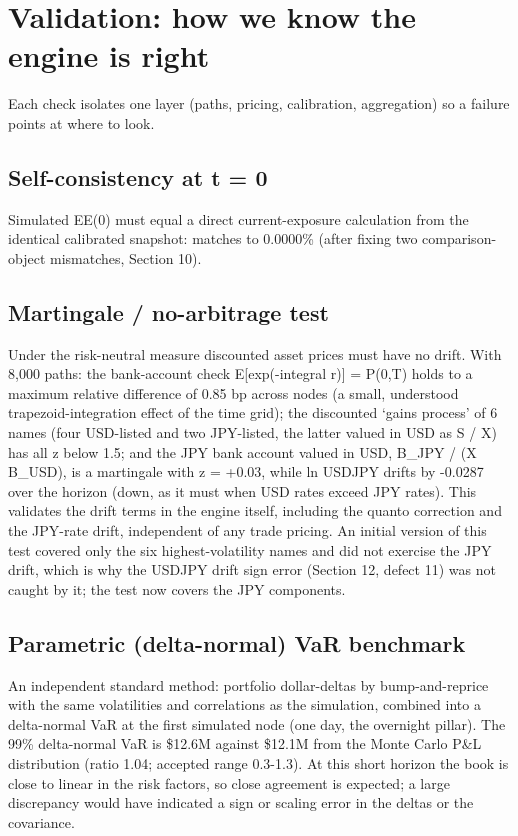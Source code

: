 \documentclass[11pt,letterpaper]{article}
\begin{document}
\clearpage
\section{Validation: how we know the engine is right}
Each check isolates one layer (paths, pricing, calibration, aggregation) so a failure points at where to look.

\subsection{Self-consistency at t = 0}
Simulated EE(0) must equal a direct current-exposure calculation from the identical calibrated snapshot: matches to 0.0000\% (after fixing two comparison-object mismatches, Section 10).

\subsection{Martingale / no-arbitrage test}
Under the risk-neutral measure discounted asset prices must have no drift. With 8,000 paths: the bank-account check E[exp(-integral r)] = P(0,T) holds to a maximum relative difference of 0.85 bp across nodes (a small, understood trapezoid-integration effect of the time grid); the discounted `gains process' of 6 names (four USD-listed and two JPY-listed, the latter valued in USD as S / X) has all \textbar{}z\textbar{} below 1.5; and the JPY bank account valued in USD, B\_JPY / (X B\_USD), is a martingale with z = +0.03, while ln USDJPY drifts by -0.0287 over the horizon (down, as it must when USD rates exceed JPY rates). This validates the drift terms in the engine itself, including the quanto correction and the JPY-rate drift, independent of any trade pricing. An initial version of this test covered only the six highest-volatility names and did not exercise the JPY drift, which is why the USDJPY drift sign error (Section 12, defect 11) was not caught by it; the test now covers the JPY components.

\subsection{Parametric (delta-normal) VaR benchmark}
An independent standard method: portfolio dollar-deltas by bump-and-reprice with the same volatilities and correlations as the simulation, combined into a delta-normal VaR at the first simulated node (one day, the overnight pillar). The 99\% delta-normal VaR is \$12.6M against \$12.1M from the Monte Carlo P\&L distribution (ratio 1.04; accepted range 0.3-1.3). At this short horizon the book is close to linear in the risk factors, so close agreement is expected; a large discrepancy would have indicated a sign or scaling error in the deltas or the covariance.
\end{document}
